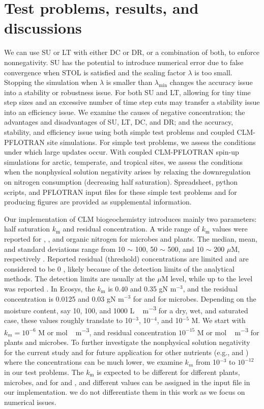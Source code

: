 \documentclass[gmd, manuscript]{copernicus}
\begin{document}
%

\section{Test problems, results, and discussions}
We can use SU or LT with either DC or DR, or a combination of both, to enforce
nonnegativity. SU has the potential to introduce numerical error due to false
convergence when STOL is satisfied and the scaling factor $\lambda$ is too
small. Stopping the simulation when $\lambda$ is smaller than
$\lambda_\text{min}$ changes the accuracy issue into a stability or robustness
issue. For both SU and LT, allowing for tiny time step sizes and an excessive
number of time step cuts may transfer a stability issue into an efficiency
issue. We examine the causes of negative concentration; the advantages and
disadvantages of SU, LT, DC, and DR; and the accuracy, stability, and
efficiency issue using both simple test problems and coupled CLM-PFLOTRAN site
simulations. For simple test problems, we assess the conditions under which large
updates occur. With coupled CLM-PFLOTRAN spin-up simulations for arctic,
temperate, and tropical sites, we assess the conditions when the nonphysical solution negativity 
arises by relaxing the downregulation on nitrogen consumption (decreasing half
saturation). Spreadsheet, python scripts, and PFLOTRAN input files for these
simple test problems and for producing figures are provided as supplemental
information.

Our implementation of CLM biogeochemistry introduces mainly two parameters:
half saturation $k_\text{m}$ and residual concentration. A wide range of
$k_\text{m}$ values were reported for , , and organic
nitrogen for microbes and plants. The median, mean, and standard deviations
range from 10 $\sim$ 100, 50 $\sim$ 500, and 10 $\sim$ 200 $\mu$M, respectively
\citep{Kuzyakov2013}. Reported residual (threshold) concentrations are limited
and are considered to be 0 \cite[e.g.,][]{Hogh1997}, likely because of the
detection limits of the analytical methods. The detection limits are usually at the
$\mu$M level, while up to the  level was reported \citep{Nollet2013}. In Ecosys,
the $k_\text{m}$ is 0.40 and 0.35 gN m$^{-3}$, and the residual concentration
is 0.0125 and 0.03 gN m$^{-3}$ \citep{Grant2013} for  and
 for microbes.  Depending on the moisture content, say 10, 100,
and 1000 \unit{L\, m^{-3}} for a dry, wet, and saturated case, these
 values roughly translate to 10$^{-3}$, 10$^{-4}$, and
10$^{-5}$ \unit{M}. We start with $k_m=10^{-6}$ \unit{M} or \unit{mol\,m^{-3}},
and residual concentration $10^{-15}$ \unit{M} or \unit{mol\, m^{-3}} for
plants and microbes. To further investigate the nonphysical solution negativity for the
current study and for future application for other nutrients (e.g., 
and ) where the concentrations can be much lower, we examine $k_m$
from 10$^{-3}$ to $10^{-12}$ in our test problems. The $k_\text{m}$ is expected
to be different for different plants, microbes, and for  and
, and different values can be assigned in the input file in our
implementation. we do not differentiate them in this work as we focus on
numerical issues. 
\end{document}
